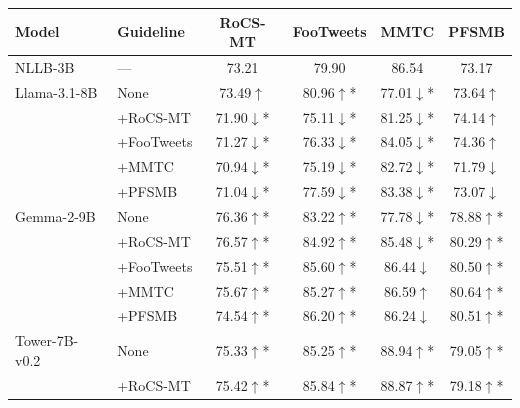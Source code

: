 \begin{tabular}{llcccc}
\toprule
Model & Guideline & RoCS-MT & FooTweets & MMTC & PFSMB \\
\midrule
NLLB-3B & — & 73.21 & 79.90 & 86.54 & 73.17 \\
Llama-3.1-8B & None & 73.49\colorbox{mygreen}{$\uparrow$} & 80.96\colorbox{mygreen}{$\uparrow$}* & 77.01\colorbox{myred}{$\downarrow$}* & 73.64\colorbox{mygreen}{$\uparrow$} \\
 & +RoCS-MT & 71.90\colorbox{myred}{$\downarrow$}* & 75.11\colorbox{myred}{$\downarrow$}* & 81.25\colorbox{myred}{$\downarrow$}* & 74.14\colorbox{mygreen}{$\uparrow$} \\
 & +FooTweets & 71.27\colorbox{myred}{$\downarrow$}* & 76.33\colorbox{myred}{$\downarrow$}* & 84.05\colorbox{myred}{$\downarrow$}* & 74.36\colorbox{mygreen}{$\uparrow$} \\
 & +MMTC & 70.94\colorbox{myred}{$\downarrow$}* & 75.19\colorbox{myred}{$\downarrow$}* & 82.72\colorbox{myred}{$\downarrow$}* & 71.79\colorbox{myred}{$\downarrow$} \\
 & +PFSMB & 71.04\colorbox{myred}{$\downarrow$}* & 77.59\colorbox{myred}{$\downarrow$}* & 83.38\colorbox{myred}{$\downarrow$}* & 73.07\colorbox{myred}{$\downarrow$} \\
Gemma-2-9B & None & 76.36\colorbox{mygreen}{$\uparrow$}* & 83.22\colorbox{mygreen}{$\uparrow$}* & 77.78\colorbox{myred}{$\downarrow$}* & 78.88\colorbox{mygreen}{$\uparrow$}* \\
 & +RoCS-MT & 76.57\colorbox{mygreen}{$\uparrow$}* & 84.92\colorbox{mygreen}{$\uparrow$}* & 85.48\colorbox{myred}{$\downarrow$}* & 80.29\colorbox{mygreen}{$\uparrow$}* \\
 & +FooTweets & 75.51\colorbox{mygreen}{$\uparrow$}* & 85.60\colorbox{mygreen}{$\uparrow$}* & 86.44\colorbox{myred}{$\downarrow$} & 80.50\colorbox{mygreen}{$\uparrow$}* \\
 & +MMTC & 75.67\colorbox{mygreen}{$\uparrow$}* & 85.27\colorbox{mygreen}{$\uparrow$}* & 86.59\colorbox{mygreen}{$\uparrow$} & 80.64\colorbox{mygreen}{$\uparrow$}* \\
 & +PFSMB & 74.54\colorbox{mygreen}{$\uparrow$}* & 86.20\colorbox{mygreen}{$\uparrow$}* & 86.24\colorbox{myred}{$\downarrow$} & 80.51\colorbox{mygreen}{$\uparrow$}* \\
Tower-7B-v0.2 & None & 75.33\colorbox{mygreen}{$\uparrow$}* & 85.25\colorbox{mygreen}{$\uparrow$}* & 88.94\colorbox{mygreen}{$\uparrow$}* & 79.05\colorbox{mygreen}{$\uparrow$}* \\
 & +RoCS-MT & 75.42\colorbox{mygreen}{$\uparrow$}* & 85.84\colorbox{mygreen}{$\uparrow$}* & 88.87\colorbox{mygreen}{$\uparrow$}* & 79.18\colorbox{mygreen}{$\uparrow$}* \\

\end{tabular}

